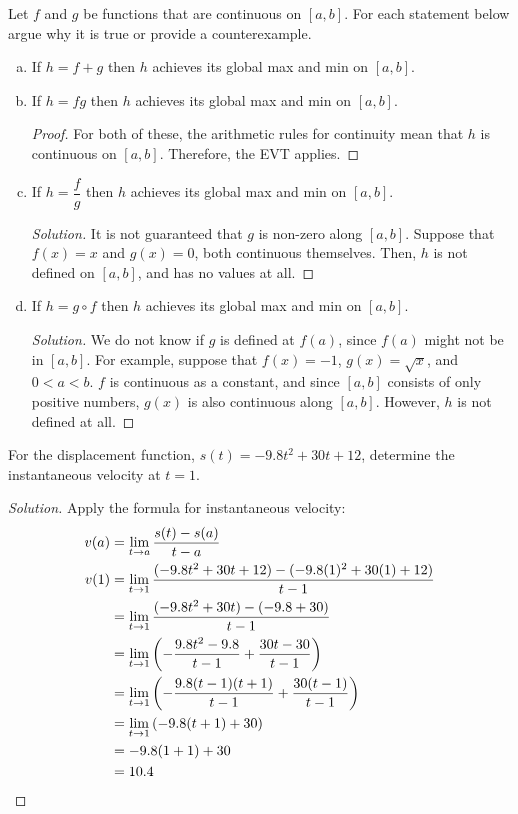 \documentclass{agony}
\begin{document}
\question Let $f$ and $g$ be functions that are continuous on $[a,b]$.
For each statement below argue why it is true or provide a counterexample.
\begin{enumerate}[(a)]
  \item If $h=f+g$ then $h$ achieves its global max and min on $[a,b]$.
  \item If $h=fg$ then $h$ achieves its global max and min on $[a,b]$.
        \begin{proof}
          For both of these, the arithmetic rules for continuity mean that $h$ is continuous on $[a,b]$.
          Therefore, the EVT applies.
        \end{proof}
  \item If $h=\dfrac{f}{g}$ then $h$ achieves its global max and min on $[a,b]$.
        \begin{proof}[Solution]
          It is not guaranteed that $g$ is non-zero along $[a,b]$.
          Suppose that $f(x) = x$ and $g(x) = 0$, both continuous themselves.
          Then, $h$ is not defined on $[a,b]$, and has no values at all.
        \end{proof}
  \item If $h=g\circ f$ then $h$ achieves its global max and min on $[a,b]$.
        \begin{proof}[Solution]
          We do not know if $g$ is defined at $f(a)$, since $f(a)$ might not be in $[a,b]$.
          For example, suppose that $f(x)=-1$, $g(x)=\sqrt{x}$, and $0<a<b$.
          $f$ is continuous as a constant, and since $[a,b]$ consists of only positive numbers,
          $g(x)$ is also continuous along $[a,b]$.
          However, $h$ is not defined at all.
        \end{proof}
\end{enumerate}

\question For the displacement function, $s(t)=-9.8t^2+30t+12$, determine the instantaneous velocity at $t=1$.
\begin{proof}[Solution]
  Apply the formula for instantaneous velocity:
  \begin{align*}
    v(a) & = \lim\limits_{t\to a} \frac{s(t) - s(a)}{t-a}                                         \\
    v(1) & = \lim\limits_{t\to1} \frac{(-9.8t^2 + 30t + 12) - (-9.8(1)^2 + 30(1) + 12)}{t-1}     \\
         & = \lim\limits_{t\to1} \frac{(-9.8t^2 + 30t) - (-9.8 + 30)}{t-1}                       \\
         & = \lim\limits_{t\to1} \left( -\frac{9.8t^2-9.8}{t-1} + \frac{30t-30}{t-1} \right)     \\
         & = \lim\limits_{t\to1} \left( -\frac{9.8(t-1)(t+1)}{t-1} + \frac{30(t-1)}{t-1} \right) \\
         & = \lim\limits_{t\to1} \left( -9.8(t+1) + 30 \right)                                   \\
         & = -9.8(1+1) + 30                                                              \\
         & = 10.4 \qedhere
  \end{align*}
\end{proof}
\end{document}
